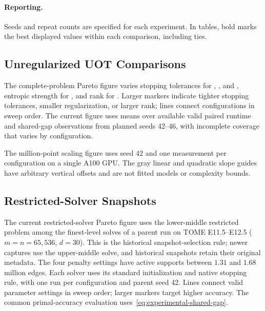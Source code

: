 \paragraph{Reporting.}
Seeds and repeat counts are specified for each experiment.
In tables, bold marks the best displayed values within each comparison, including ties.

\subsection{Unregularized UOT Comparisons}
The complete-problem Pareto figure varies stopping tolerances for \ours, \mm, and \hellouot, entropic strength for \sinkhorn, and rank for \ulot.
Larger markers indicate tighter stopping tolerances, smaller \sinkhorn regularization, or larger \ulot rank; lines connect configurations in sweep order.
The current figure uses means over available valid paired runtime and shared-gap observations from planned seeds 42--46, with incomplete coverage that varies by configuration.

The million-point scaling figure uses seed 42 and one measurement per configuration on a single A100 GPU.
The gray linear and quadratic slope guides have arbitrary vertical offsets and are not fitted models or complexity bounds.

\subsection{Restricted-Solver Snapshots}
\label{app:restricted-experiment-protocol}
The current restricted-solver Pareto figure uses the lower-middle restricted problem among the finest-level solves of a parent \ours run on TOME E11.5--E12.5 ($m=n=65{,}536$, $d=30$).
This is the historical snapshot-selection rule; newer captures use the upper-middle solve, and historical snapshots retain their original metadata.
The four penalty settings have active supports between $1.31$ and $1.68$ million edges.
Each solver uses its standard initialization and native stopping rule, with one run per configuration and parent seed 42.
Lines connect valid parameter settings in sweep order; larger markers target higher accuracy.
The common primal-accuracy evaluation uses~\eqref{eq:experimental-shared-gap}.

